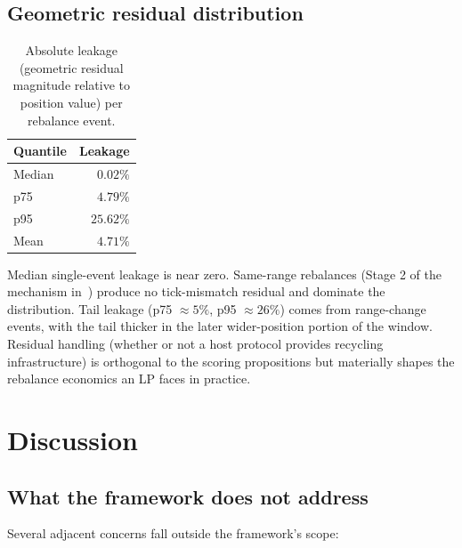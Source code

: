 \documentclass[11pt,a4paper]{article}
\theoremstyle{cgdefinition}
\theoremstyle{cgplain}
\theoremstyle{cgremark}
\begin{document}
\subsection{Geometric residual distribution}\label{sec:calresidual}

\begin{table}[H]
\centering
\begin{tabular}{@{}lr@{}}
\toprule
Quantile & Leakage \\
\midrule
Median & $0.02\%$ \\
p75 & $4.79\%$ \\
p95 & $25.62\%$ \\
Mean & $4.71\%$ \\
\bottomrule
\end{tabular}
\caption{Absolute leakage (geometric residual magnitude relative to position value) per rebalance event.}
\label{tab:leakage}
\end{table}

Median single-event leakage is near zero. Same-range rebalances (Stage 2 of the mechanism in~\cite{ryan2026a}) produce no tick-mismatch residual and dominate the distribution. Tail leakage (p75 $\approx 5\%$, p95 $\approx 26\%$) comes from range-change events, with the tail thicker in the later wider-position portion of the window. Residual handling (whether or not a host protocol provides recycling infrastructure) is orthogonal to the scoring propositions but materially shapes the rebalance economics an LP faces in practice.

\section{Discussion}\label{sec:discussion}

\subsection{What the framework does not address}\label{sec:outofscope}

Several adjacent concerns fall outside the framework's scope:
\end{document}
